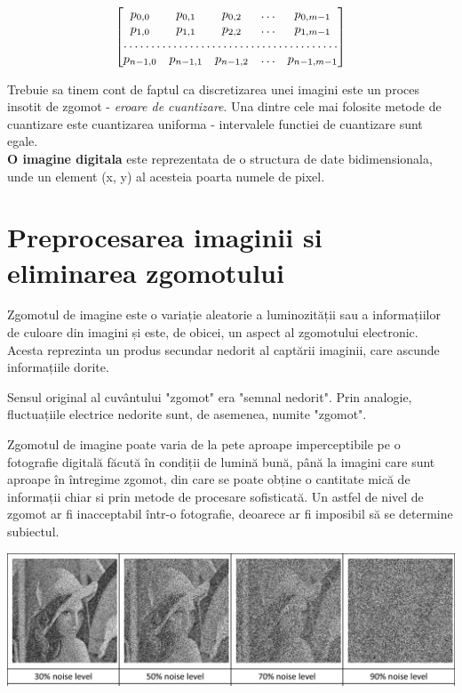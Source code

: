 \documentclass[10pt]{article}
\begin{document}
\[
\begin{bmatrix}
    p_{0,0}       & p_{0,1} & p_{0,2} & \dots & p_{0,m-1} \\
    p_{1,0}       & p_{1,1} & p_{2,2} & \dots & p_{1,m-1} \\
    \hdotsfor{5} \\
    p_{n-1,0}       & p_{n-1,1} & p_{n-1,2} & \dots & p_{n-1,m-1}
\end{bmatrix}
\]

\> Trebuie sa tinem cont de faptul ca discretizarea unei imagini este un proces insotit de zgomot - {\it eroare de cuantizare}.
Una dintre cele mai folosite metode de cuantizare este cuantizarea uniforma - intervalele
functiei de cuantizare sunt egale. \\

\> {\bf O imagine digitala} este reprezentata de o structura de date bidimensionala, unde un
element (x, y) al acesteia poarta numele de pixel.

\newpage

\section{Preprocesarea imaginii si eliminarea zgomotului}

\> Zgomotul de imagine este o variație aleatorie a luminozității sau a informațiilor de culoare
din imagini și este, de obicei, un aspect al zgomotului electronic.
Acesta reprezinta un produs secundar nedorit al captării imaginii, care ascunde informațiile dorite.

\> Sensul original al cuvântului "zgomot" era "semnal nedorit". Prin analogie, fluctuațiile electrice nedorite sunt, de asemenea, numite "zgomot".

\> Zgomotul de imagine poate varia de la pete aproape imperceptibile pe o fotografie digitală făcută în condiții de lumină bună,
până la imagini care sunt aproape în întregime zgomot,
din care se poate obține o cantitate mică de informații chiar si prin metode de procesare sofisticată.
Un astfel de nivel de zgomot ar fi inacceptabil într-o fotografie, deoarece ar fi imposibil să se determine subiectul.

\begin{center}

  \includegraphics[scale=0.2]{noisy-images}
  
\end{center}
\end{document}
